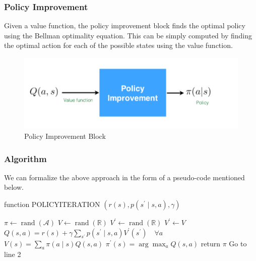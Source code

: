\documentclass[11pt]{article}
\begin{document}
\subsubsection{Policy Improvement}
Given a value function, the policy improvement block finds the optimal policy using the Bellman optimality equation. This can be simply computed by finding the optimal action for each of the possible states using the value function. \\
\begin{figure}[H]
    \centering
    \includegraphics[scale=0.4]{images/improvement.png}
    \caption{Policy Improvement Block}
\end{figure}
\newpage
\subsubsection{Algorithm}
We can formalize the above approach in the form of a pseudo-code mentioned below. \\

	\begin{algorithm}[H]
	\caption{function POLICYITERATION $\left(r(s), p\left(s^{\prime} \mid s, a\right), \gamma\right)$}
    \begin{algorithmic}[1]
    \STATE $\pi \leftarrow \operatorname{rand}(\mathcal{A})$
    \STATE $V \leftarrow \operatorname{rand}(\mathbb{R})$
    \STATE $V^{\prime} \leftarrow \operatorname{rand}(\mathbb{R})$
    \STATE $V^{\prime} \leftarrow V$
    \STATE $Q(s, a)=r(s)+\gamma \sum_{s^{\prime}} p\left(s^{\prime} \mid s, a\right) V^{\prime}\left(s^{\prime}\right) \quad \forall a$
    \STATE $V(s)=\sum_{a} \pi(a \mid s) Q(s, a)$
    \ENDFOR
    \ENDWHILE
    \STATE $\pi^{\prime}(s)=\arg \max _{a} Q(s, a)$
    \ENDFOR
    \IF{$\pi^{\prime}=\pi$}
    \STATE return $\pi$
    \ENDIF
    \STATE Go to line 2
    \end{algorithmic}
	\end{algorithm}
\end{document}
